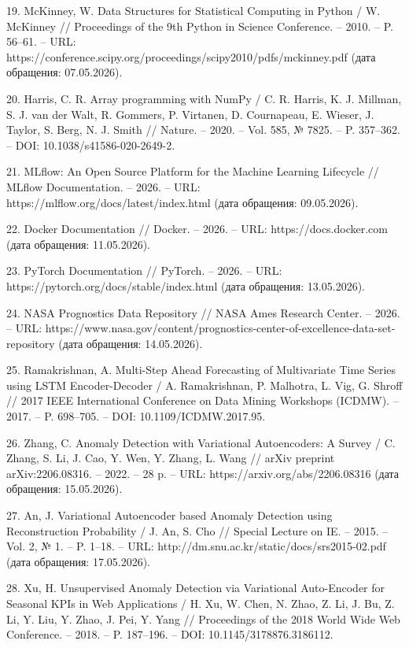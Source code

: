 \documentclass[14pt, a4paper, oneside]{extreport}
\begin{document}
19. McKinney, W. Data Structures for Statistical Computing in Python / W. McKinney // Proceedings of the 9th Python in Science Conference. – 2010. – P. 56–61. – URL: https://conference.scipy.org/proceedings/scipy2010/pdfs/mckinney.pdf (дата обращения: 07.05.2026).

20. Harris, C. R. Array programming with NumPy / C. R. Harris, K. J. Millman, S. J. van der Walt, R. Gommers, P. Virtanen, D. Cournapeau, E. Wieser, J. Taylor, S. Berg, N. J. Smith // Nature. – 2020. – Vol. 585, № 7825. – P. 357–362. – DOI: 10.1038/s41586-020-2649-2.

21. MLflow: An Open Source Platform for the Machine Learning Lifecycle // MLflow Documentation. – 2026. – URL: https://mlflow.org/docs/latest/index.html (дата обращения: 09.05.2026).

22. Docker Documentation // Docker. – 2026. – URL: https://docs.docker.com (дата обращения: 11.05.2026).

23. PyTorch Documentation // PyTorch. – 2026. – URL: https://pytorch.org/docs/stable/index.html (дата обращения: 13.05.2026).

24. NASA Prognostics Data Repository // NASA Ames Research Center. – 2026. – URL: https://www.nasa.gov/content/prognostics-center-of-excellence-data-set-repository (дата обращения: 14.05.2026).

25. Ramakrishnan, A. Multi-Step Ahead Forecasting of Multivariate Time Series using LSTM Encoder-Decoder / A. Ramakrishnan, P. Malhotra, L. Vig, G. Shroff // 2017 IEEE International Conference on Data Mining Workshops (ICDMW). – 2017. – P. 698–705. – DOI: 10.1109/ICDMW.2017.95.

26. Zhang, C. Anomaly Detection with Variational Autoencoders: A Survey / C. Zhang, S. Li, J. Cao, Y. Wen, Y. Zhang, L. Wang // arXiv preprint arXiv:2206.08316. – 2022. – 28 p. – URL: https://arxiv.org/abs/2206.08316 (дата обращения: 15.05.2026).

27. An, J. Variational Autoencoder based Anomaly Detection using Reconstruction Probability / J. An, S. Cho // Special Lecture on IE. – 2015. – Vol. 2, № 1. – P. 1–18. – URL: http://dm.snu.ac.kr/static/docs/srs2015-02.pdf (дата обращения: 17.05.2026).

28. Xu, H. Unsupervised Anomaly Detection via Variational Auto-Encoder for Seasonal KPIs in Web Applications / H. Xu, W. Chen, N. Zhao, Z. Li, J. Bu, Z. Li, Y. Liu, Y. Zhao, J. Pei, Y. Yang // Proceedings of the 2018 World Wide Web Conference. – 2018. – P. 187–196. – DOI: 10.1145/3178876.3186112.
\end{document}
